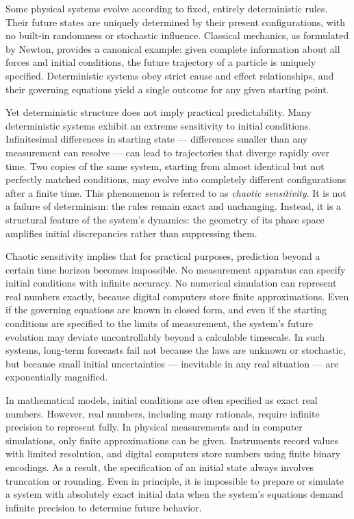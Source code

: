 Some physical systems evolve according to fixed, entirely deterministic rules. Their future states are uniquely determined by their present configurations, with no built-in randomness or stochastic influence. Classical mechanics, as formulated by Newton, provides a canonical example: given complete information about all forces and initial conditions, the future trajectory of a particle is uniquely specified. Deterministic systems obey strict cause and effect relationships, and their governing equations yield a single outcome for any given starting point.

Yet deterministic structure does not imply practical predictability. Many deterministic systems exhibit an extreme sensitivity to initial conditions. Infinitesimal differences in starting state — differences smaller than any measurement can resolve — can lead to trajectories that diverge rapidly over time. Two copies of the same system, starting from almost identical but not perfectly matched conditions, may evolve into completely different configurations after a finite time. This phenomenon is referred to as \emph{chaotic sensitivity}. It is not a failure of determinism: the rules remain exact and unchanging. Instead, it is a structural feature of the system’s dynamics: the geometry of its phase space amplifies initial discrepancies rather than suppressing them.

Chaotic sensitivity implies that for practical purposes, prediction beyond a certain time horizon becomes impossible. No measurement apparatus can specify initial conditions with infinite accuracy. No numerical simulation can represent real numbers exactly, because digital computers store finite approximations. Even if the governing equations are known in closed form, and even if the starting conditions are specified to the limits of measurement, the system’s future evolution may deviate uncontrollably beyond a calculable timescale. In such systems, long-term forecasts fail not because the laws are unknown or stochastic, but because small initial uncertainties — inevitable in any real situation — are exponentially magnified.

In mathematical models, initial conditions are often specified as exact real numbers. However, real numbers, including many rationals, require infinite precision to represent fully. In physical measurements and in computer simulations, only finite approximations can be given. Instruments record values with limited resolution, and digital computers store numbers using finite binary encodings. As a result, the specification of an initial state always involves truncation or rounding. Even in principle, it is impossible to prepare or simulate a system with absolutely exact initial data when the system's equations demand infinite precision to determine future behavior.


